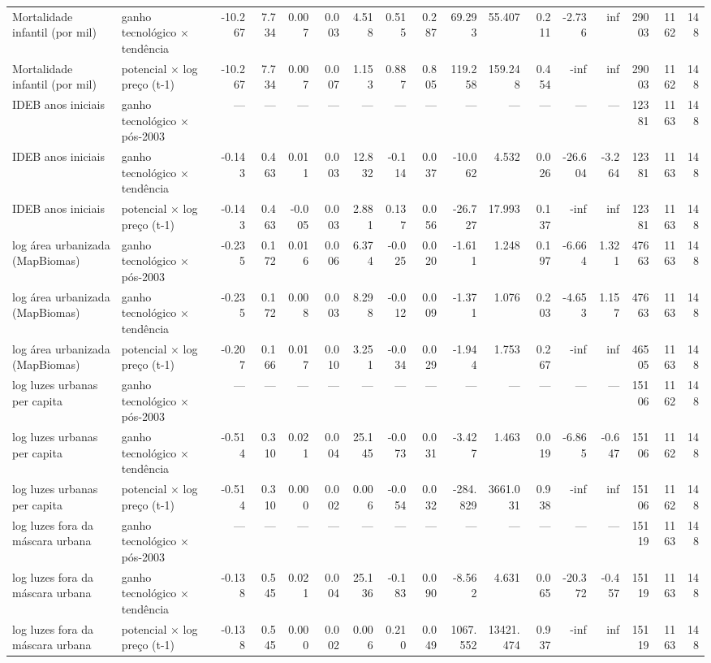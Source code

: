 \begin{table}
\begin{tabular}{llrrrrrrrrrrrrrrr}
Mortalidade infantil (por mil) & ganho tecnológico × tendência & -10.267 & 7.734 & 0.007 & 0.003 & 4.518 & 0.515 & 0.287 & 69.293 & 55.407 & 0.211 & -2.736 & inf & 29003 & 1162 & 148 \\
Mortalidade infantil (por mil) & potencial × log preço (t-1) & -10.267 & 7.734 & 0.007 & 0.007 & 1.153 & 0.887 & 0.805 & 119.258 & 159.248 & 0.454 & -inf & inf & 29003 & 1162 & 148 \\
IDEB anos iniciais & ganho tecnológico × pós-2003 & — & — & — & — & — & — & — & — & — & — & — & — & 12381 & 1163 & 148 \\
IDEB anos iniciais & ganho tecnológico × tendência & -0.143 & 0.463 & 0.011 & 0.003 & 12.832 & -0.114 & 0.037 & -10.062 & 4.532 & 0.026 & -26.604 & -3.264 & 12381 & 1163 & 148 \\
IDEB anos iniciais & potencial × log preço (t-1) & -0.143 & 0.463 & -0.005 & 0.003 & 2.881 & 0.137 & 0.056 & -26.727 & 17.993 & 0.137 & -inf & inf & 12381 & 1163 & 148 \\
log área urbanizada (MapBiomas) & ganho tecnológico × pós-2003 & -0.235 & 0.172 & 0.016 & 0.006 & 6.374 & -0.025 & 0.020 & -1.611 & 1.248 & 0.197 & -6.664 & 1.321 & 47663 & 1163 & 148 \\
log área urbanizada (MapBiomas) & ganho tecnológico × tendência & -0.235 & 0.172 & 0.008 & 0.003 & 8.298 & -0.012 & 0.009 & -1.371 & 1.076 & 0.203 & -4.653 & 1.157 & 47663 & 1163 & 148 \\
log área urbanizada (MapBiomas) & potencial × log preço (t-1) & -0.207 & 0.166 & 0.017 & 0.010 & 3.251 & -0.034 & 0.029 & -1.944 & 1.753 & 0.267 & -inf & inf & 46505 & 1163 & 148 \\
log luzes urbanas per capita & ganho tecnológico × pós-2003 & — & — & — & — & — & — & — & — & — & — & — & — & 15106 & 1162 & 148 \\
log luzes urbanas per capita & ganho tecnológico × tendência & -0.514 & 0.310 & 0.021 & 0.004 & 25.145 & -0.073 & 0.031 & -3.427 & 1.463 & 0.019 & -6.865 & -0.647 & 15106 & 1162 & 148 \\
log luzes urbanas per capita & potencial × log preço (t-1) & -0.514 & 0.310 & 0.000 & 0.002 & 0.006 & -0.054 & 0.032 & -284.829 & 3661.031 & 0.938 & -inf & inf & 15106 & 1162 & 148 \\
log luzes fora da máscara urbana & ganho tecnológico × pós-2003 & — & — & — & — & — & — & — & — & — & — & — & — & 15119 & 1163 & 148 \\
log luzes fora da máscara urbana & ganho tecnológico × tendência & -0.138 & 0.545 & 0.021 & 0.004 & 25.136 & -0.183 & 0.090 & -8.562 & 4.631 & 0.065 & -20.372 & -0.457 & 15119 & 1163 & 148 \\
log luzes fora da máscara urbana & potencial × log preço (t-1) & -0.138 & 0.545 & 0.000 & 0.002 & 0.006 & 0.210 & 0.049 & 1067.552 & 13421.474 & 0.937 & -inf & inf & 15119 & 1163 & 148 \\
\bottomrule
\end{tabular}
\end{table}
